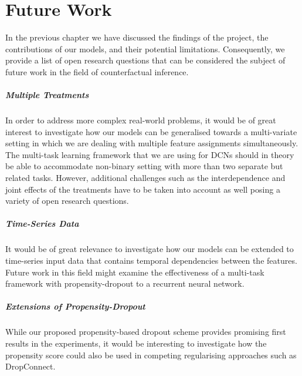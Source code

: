 %

\chapter{\label{ch:7-future-work}Future Work} 
In the previous chapter we have discussed the findings of the project, the contributions of our models, and their potential limitations. Consequently, we provide a list of open research questions that can be considered the subject of future work in the field of counterfactual inference. 

\paragraph{Multiple Treatments} In order to address more complex real-world problems, it would be of great interest to investigate how our models can be generalised towards a multi-variate setting in which we are dealing with multiple feature assignments simultaneously. The multi-task learning framework that we are using for DCNs should in theory be able to accommodate non-binary setting with more than two separate but related tasks. However, additional challenges such as the interdependence and joint effects of the treatments have to be taken into account as well posing a variety of open research questions. 

\paragraph{Time-Series Data} It would be of great relevance to investigate how our models can be extended to time-series input data that contains temporal dependencies between the features. Future work in this field might examine the effectiveness of a multi-task framework with propensity-dropout to a recurrent neural network. 

\paragraph{Extensions of Propensity-Dropout} While our proposed propensity-based dropout scheme provides promising first results in the experiments, it would be interesting to investigate how the propensity score could also be used in competing regularising approaches such as DropConnect. %


